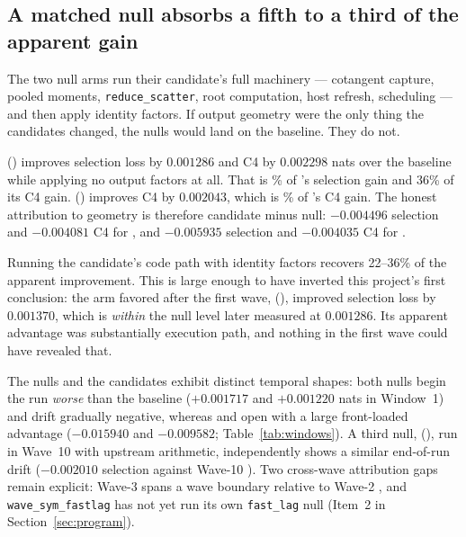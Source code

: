 \subsection{A matched null absorbs a fifth to a third of the apparent gain}
\label{sec:null}

The two null arms run their candidate's full machinery --- cotangent capture,
pooled moments, \verb|reduce_scatter|, root computation, host refresh,
scheduling --- and then apply identity factors. If output geometry were the only
thing the candidates changed, the nulls would land on the baseline. They do not.

 (\nullall{}) improves selection loss by $0.001286$ and C4 by
$0.002298$ nats over the baseline while applying no output factors at all. That
is \nullsharedense\% of 's selection gain and 36\% of its C4
gain.  (\nullmlp{}) improves C4 by $0.002043$, which is
\nullsharemlpcfour\% of 's C4 gain. The honest attribution to
geometry is therefore candidate minus null: $-0.004496$ selection and
$-0.004081$ C4 for , and $-0.005935$ selection and $-0.004035$ C4
for .

\begin{finding}
Running the candidate's code path with identity factors recovers 22--36\% of
the apparent improvement. This is large enough to have inverted this project's
first conclusion: the arm favored after the first wave, 
(\outerdown{}), improved selection loss by $0.001370$, which is \emph{within}
the null level later measured at $0.001286$. Its apparent advantage was
substantially execution path, and nothing in the first wave could have revealed
that.
\end{finding}

The nulls and the candidates exhibit distinct temporal shapes: both nulls begin
the run \emph{worse} than the baseline ($+0.001717$ and $+0.001220$ nats in
Window~1) and drift gradually negative, whereas  and
 open with a large front-loaded advantage ($-0.015940$ and
$-0.009582$; Table~\ref{tab:windows}). A third null, 
(\nullod{}), run in Wave~10 with upstream arithmetic, independently shows a
similar end-of-run drift ($-0.002010$ selection against Wave-10 \muont{}). Two
cross-wave attribution gaps remain explicit: Wave-3  spans a wave
boundary relative to Wave-2 , and \texttt{wave\_sym\_fastlag} has
not yet run its own \texttt{fast\_lag} null (Item~2 in Section~\ref{sec:program}).

